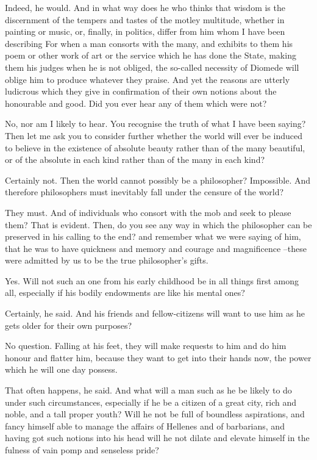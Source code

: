 Indeed, he would.
And in what way does he who thinks that wisdom is the discernment of the tempers and tastes of the motley multitude, whether in painting or music, or, finally, in politics, differ from him whom I have been describing For when a man consorts with the many, and exhibits to them his poem or other work of art or the service which he has done the State, making them his judges when he is not obliged, the so-called necessity of Diomede will oblige him to produce whatever they praise. And yet the reasons are utterly ludicrous which they give in confirmation of their own notions about the honourable and good. Did you ever hear any of them which were not?

No, nor am I likely to hear.
You recognise the truth of what I have been saying? Then let me ask you to consider further whether the world will ever be induced to believe in the existence of absolute beauty rather than of the many beautiful, or of the absolute in each kind rather than of the many in each kind?

Certainly not.
Then the world cannot possibly be a philosopher?
Impossible.
And therefore philosophers must inevitably fall under the censure of the world?

They must.
And of individuals who consort with the mob and seek to please them?
That is evident.
Then, do you see any way in which the philosopher can be preserved in his calling to the end? and remember what we were saying of him, that he was to have quickness and memory and courage and magnificence --these were admitted by us to be the true philosopher's gifts.

Yes.
Will not such an one from his early childhood be in all things first among all, especially if his bodily endowments are like his mental ones?

Certainly, he said.
And his friends and fellow-citizens will want to use him as he gets older for their own purposes?

No question.
Falling at his feet, they will make requests to him and do him honour and flatter him, because they want to get into their hands now, the power which he will one day possess.

That often happens, he said.
And what will a man such as he be likely to do under such circumstances, especially if he be a citizen of a great city, rich and noble, and a tall proper youth? Will he not be full of boundless aspirations, and fancy himself able to manage the affairs of Hellenes and of barbarians, and having got such notions into his head will he not dilate and elevate himself in the fulness of vain pomp and senseless pride?

